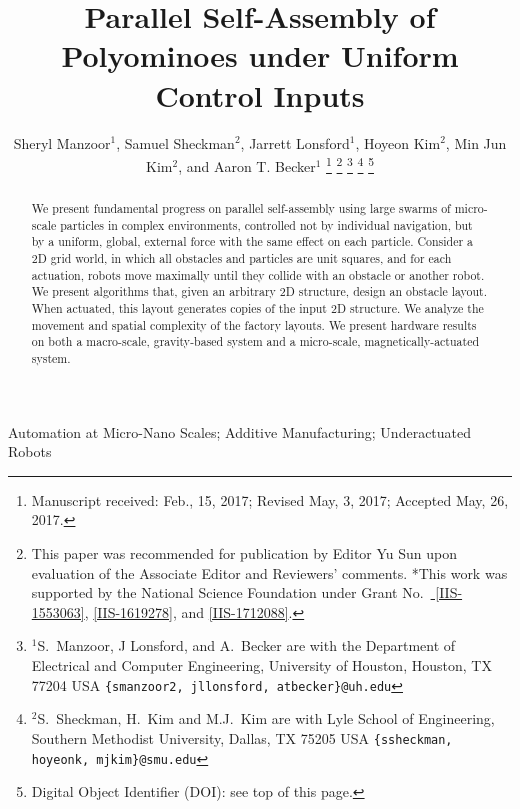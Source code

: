 \documentclass[letterpaper, 10 pt, journal, twoside]{ieeetran}
\begin{document}
\title{Parallel Self-Assembly of Polyominoes under Uniform Control Inputs}
\author{Sheryl Manzoor$^{1}$, Samuel Sheckman$^{2}$, Jarrett Lonsford$^{1}$, Hoyeon Kim$^{2}$, Min Jun Kim$^{2}$, and Aaron T. Becker$^{1}$%
\thanks{Manuscript received: Feb., 15, 2017; Revised May, 3, 2017; Accepted May, 26, 2017.}%
\thanks{This paper was recommended for publication by Editor Yu Sun upon evaluation of the Associate Editor and Reviewers' comments. *This work was supported by the National Science Foundation under Grant No.\ \href{http://nsf.gov/awardsearch/showAward?AWD_ID=1553063}{ [IIS-1553063]}, \href{http://nsf.gov/awardsearch/showAward?AWD_ID=1619278}{[IIS-1619278]}, and \href{https://nsf.gov/awardsearch/showAward?AWD_ID=1712088}{[IIS-1712088]}.}%
\thanks{$^{1}$S.~Manzoor, J Lonsford, and  A.~Becker are with the Department of Electrical and Computer Engineering,  University of Houston, Houston, TX 77204 USA        {\tt\small  \{smanzoor2, jllonsford, atbecker\}@uh.edu}}%
\thanks{$^{2} $S.~Sheckman, H.~Kim and M.J.~Kim are with Lyle School of Engineering,   Southern Methodist University, Dallas, TX 75205 USA        {\tt\small  \{ssheckman, hoyeonk, mjkim\}@smu.edu}}%
\thanks{Digital Object Identifier (DOI): see top of this page.}
}
\maketitle


\begin{abstract} 
We present fundamental progress on parallel self-assembly using large swarms of micro-scale particles in complex environments, controlled not by individual navigation, but by a uniform, global, external force with the same effect on each particle.
Consider a 2D grid world, in which all obstacles and particles are unit squares,
and for each actuation, robots move maximally until they collide with an obstacle or another robot. 
We present algorithms that, given an arbitrary 2D structure, design an obstacle layout.
 When actuated, this layout generates copies of the input 2D structure.
We analyze the movement and spatial complexity of the factory layouts. 
We present hardware results on both a macro-scale, gravity-based system and a micro-scale, magnetically-actuated system.
\end{abstract}
\begin{IEEEkeywords}
Automation at Micro-Nano Scales; Additive Manufacturing; Underactuated Robots
\end{IEEEkeywords}












\end{document}
